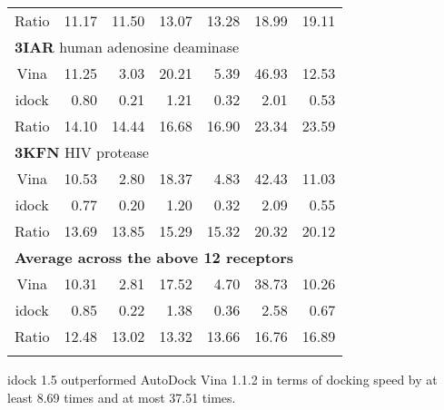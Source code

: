 \documentclass{bioinfo}
\begin{document}
\begin{table}
{\begin{tabular}{crrrrrr}
Ratio & 11.17 & 11.50 & 13.07 & 13.28 & 18.99 & 19.11\\
\multicolumn{7}{l}{\textbf{3IAR} human adenosine deaminase}\\
Vina  & 11.25 &  3.03 & 20.21 &  5.39 & 46.93 & 12.53\\
idock &  0.80 &  0.21 &  1.21 &  0.32 &  2.01 &  0.53\\
Ratio & 14.10 & 14.44 & 16.68 & 16.90 & 23.34 & 23.59\\
\multicolumn{7}{l}{\textbf{3KFN} HIV protease}\\
Vina  & 10.53 &  2.80 & 18.37 &  4.83 & 42.43 & 11.03\\
idock &  0.77 &  0.20 &  1.20 &  0.32 &  2.09 &  0.55\\
Ratio & 13.69 & 13.85 & 15.29 & 15.32 & 20.32 & 20.12\\
\multicolumn{7}{l}{\textbf{Average across the above 12 receptors}}\\
Vina  & 10.31 &  2.81 & 17.52 &  4.70 & 38.73 & 10.26\\
idock &  0.85 &  0.22 &  1.38 &  0.36 &  2.58 &  0.67\\
Ratio & 12.48 & 13.02 & 13.32 & 13.66 & 16.76 & 16.89\\
\botrule
\end{tabular}}{idock 1.5 outperformed AutoDock Vina 1.1.2 in terms of docking speed by at least 8.69 times and at most 37.51 times.}
\end{table}



\end{document}
